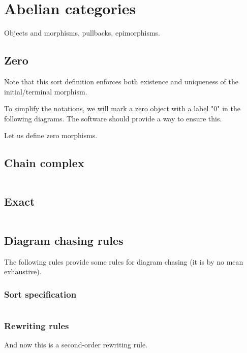 \documentclass{article}
\begin{document}
\section{Abelian categories} 
Objects and morphisms, pullbacks, epimorphisms.

\subsection{Zero}
\[

\]
Note that this sort definition enforces both existence 
and uniqueness of the initial/terminal morphism.

To simplify the notations, we will mark a zero object 
with a label "0" in the following diagrams.
The software should provide a way to ensure this.

Let us define zero morphisms.
\[

\]
\subsection{Chain complex}
\[

\]
\subsection{Exact}
\[

\]
\subsection{Diagram chasing rules}

The following rules provide some rules 
for diagram chasing (it is by no mean exhaustive).
\subsubsection{Sort specification}
\[

\]
\subsubsection{Rewriting rules}
\[

\]
And now this is a second-order rewriting rule.
\begin{equation}

\label{eq:quotient-arrow}
\end{equation}
\end{document}
